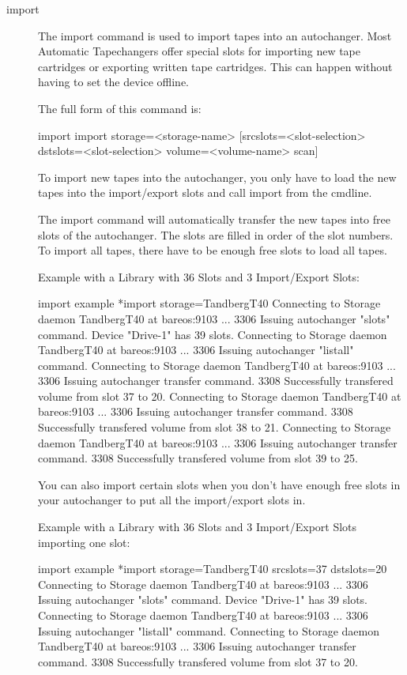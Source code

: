 \begin{description}
\item [import]
   The import command is used to import tapes into an autochanger. Most Automatic
   Tapechangers offer special slots for importing new tape cartridges or
   exporting written tape cartridges. This can happen without having to set
   the device offline.

   The full form of this command is:

\begin{bconsole}{import}
import storage=<storage-name> [srcslots=<slot-selection> dstslots=<slot-selection> volume=<volume-name> scan]
\end{bconsole}

   To import new tapes into the autochanger, you only have to load the new
   tapes into the import/export slots and call import from the cmdline.

   The import command will automatically transfer the new tapes into free
   slots of the autochanger. The slots are filled in order of the slot numbers.
   To import all tapes, there have to be enough free slots to load all tapes.

   Example with a Library with 36 Slots and 3 Import/Export Slots:

\begin{bconsole}{import example}
*import storage=TandbergT40
Connecting to Storage daemon TandbergT40 at bareos:9103 ...
3306 Issuing autochanger "slots" command.
Device "Drive-1" has 39 slots.
Connecting to Storage daemon TandbergT40 at bareos:9103 ...
3306 Issuing autochanger "listall" command.
Connecting to Storage daemon TandbergT40 at bareos:9103 ...
3306 Issuing autochanger transfer command.
3308 Successfully transfered volume from slot 37 to 20.
Connecting to Storage daemon TandbergT40 at bareos:9103 ...
3306 Issuing autochanger transfer command.
3308 Successfully transfered volume from slot 38 to 21.
Connecting to Storage daemon TandbergT40 at bareos:9103 ...
3306 Issuing autochanger transfer command.
3308 Successfully transfered volume from slot 39 to 25.
\end{bconsole}

   You can also import certain slots when you don't have enough free slots
   in your autochanger to put all the import/export slots in.

   Example with a Library with 36 Slots and 3 Import/Export Slots importing one slot:

\begin{bconsole}{import example}
*import storage=TandbergT40 srcslots=37 dstslots=20
Connecting to Storage daemon TandbergT40 at bareos:9103 ...
3306 Issuing autochanger "slots" command.
Device "Drive-1" has 39 slots.
Connecting to Storage daemon TandbergT40 at bareos:9103 ...
3306 Issuing autochanger "listall" command.
Connecting to Storage daemon TandbergT40 at bareos:9103 ...
3306 Issuing autochanger transfer command.
3308 Successfully transfered volume from slot 37 to 20.
\end{bconsole}


\end{description}

